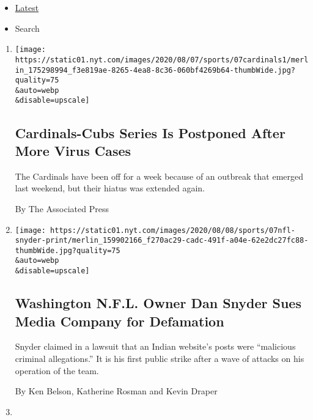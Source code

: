 \begin{itemize}
\tightlist
\item
  \protect\hyperlink{stream-panel}{Latest}
\item
  Search
\end{itemize}

\begin{enumerate}
\def\labelenumi{\arabic{enumi}.}
\item
  \href{/2020/08/07/sports/baseball/cardinals-game-postponed-coronavirus.html}{}

  \texttt{[image: https://static01.nyt.com/images/2020/08/07/sports/07cardinals1/merlin\_175298994\_f3e819ae-8265-4ea8-8c36-060bf4269b64-thumbWide.jpg?quality=75\\\&auto=webp\\\&disable=upscale]}

  \hypertarget{cardinals-cubs-series-is-postponed-after-more-virus-cases}{%
  \subsection{Cardinals-Cubs Series Is Postponed After More Virus
  Cases}\label{cardinals-cubs-series-is-postponed-after-more-virus-cases}}

  The Cardinals have been off for a week because of an outbreak that
  emerged last weekend, but their hiatus was extended again.

  By The Associated Press
\item
  \href{/2020/08/07/sports/dan-snyder-washington-nfl-defamation-lawsuit.html}{}

  \texttt{[image: https://static01.nyt.com/images/2020/08/08/sports/07nfl-snyder-print/merlin\_159902166\_f270ac29-cadc-491f-a04e-62e2dc27fc88-thumbWide.jpg?quality=75\\\&auto=webp\\\&disable=upscale]}

  \hypertarget{washington-nfl-owner-dan-snyder-sues-media-company-for-defamation}{%
  \subsection{Washington N.F.L. Owner Dan Snyder Sues Media Company for
  Defamation}\label{washington-nfl-owner-dan-snyder-sues-media-company-for-defamation}}

  Snyder claimed in a lawsuit that an Indian website's posts were
  ``malicious criminal allegations.'' It is his first public strike
  after a wave of attacks on his operation of the team.

  By Ken Belson, Katherine Rosman and Kevin Draper
\item
  \href{/2020/08/07/sports/soccer/david-silva-manchester-city.html}{}


\end{enumerate}
